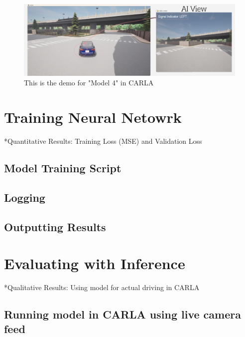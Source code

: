\documentclass{article} %
\begin{document}
\begin{figure}[H] %
    \centering
    \includegraphics[width=1.0\textwidth]{model4demo.png} %
    \caption{This is the demo for "Model 4" in CARLA}
    \label{fig:model4demo}
\end{figure}


\section{Training Neural Netowrk}

*Quantitative Results: Training Loss (MSE) and Validation Loss

\subsection{Model Training Script}

\subsection{Logging}

\subsection{Outputting Results}



\section{Evaluating with Inference}

*Qualitative Results: Using model for actual driving in CARLA

\subsection{Running model in CARLA using live camera feed}
\end{document}
